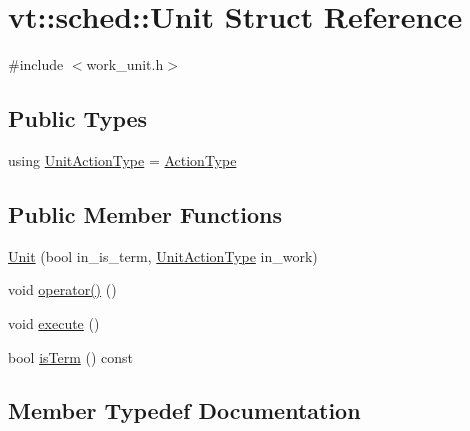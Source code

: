 \hypertarget{structvt_1_1sched_1_1_unit}{}\section{vt\+:\+:sched\+:\+:Unit Struct Reference}
\label{structvt_1_1sched_1_1_unit}


{\ttfamily \#include $<$work\+\_\+unit.\+h$>$}

\subsection*{Public Types}
\begin{DoxyCompactItemize}
\item 
using \hyperlink{structvt_1_1sched_1_1_unit_a94de9219796a6b3134e5f6f87cc017d8}{Unit\+Action\+Type} = \hyperlink{namespacevt_ae0a5a7b18cc99d7b732cb4d44f46b0f3}{Action\+Type}
\end{DoxyCompactItemize}
\subsection*{Public Member Functions}
\begin{DoxyCompactItemize}
\item 
\hyperlink{structvt_1_1sched_1_1_unit_a7445ffcd3650520b912134ab8f2213b8}{Unit} (bool in\+\_\+is\+\_\+term, \hyperlink{structvt_1_1sched_1_1_unit_a94de9219796a6b3134e5f6f87cc017d8}{Unit\+Action\+Type} in\+\_\+work)
\item 
void \hyperlink{structvt_1_1sched_1_1_unit_a27a4a3910deb80e18bfedc9720efa9f6}{operator()} ()
\item 
void \hyperlink{structvt_1_1sched_1_1_unit_abb9552d5ca05e00ea19b8d3097ad01d9}{execute} ()
\item 
bool \hyperlink{structvt_1_1sched_1_1_unit_a2efa80f96380e04ed664ba2fcd123a61}{is\+Term} () const
\end{DoxyCompactItemize}


\subsection{Member Typedef Documentation}
\mbox{\label{structvt_1_1sched_1_1_unit_a94de9219796a6b3134e5f6f87cc017d8}} 
